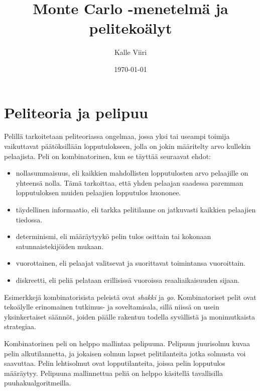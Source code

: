 \documentclass[12pt,finnish]{tktltiki2}
\title{Monte Carlo -menetelmä ja pelitekoälyt}
\author{Kalle Viiri}
\date{\today}
\theoremstyle{definition}
\theoremstyle{remark}
\begin{document}

\frontmatter      %

\maketitle        %
\makeabstract     %

\tableofcontents  %


\mainmatter       %

\section{Peliteoria ja pelipuu}

Pelillä tarkoitetaan peliteoriassa ongelmaa, jossa yksi tai useampi toimija vaikuttavat päätöksillään lopputulokseen, jolla on jokin määritelty arvo kullekin pelaajista. Peli on kombinatorinen, kun se täyttää seuraavat ehdot:~\citep{browne}

\begin{itemize}
	\item nollasummaisuus, eli kaikkien mahdollisten lopputulosten arvo pelaajille on yhteensä nolla. Tämä tarkoittaa, että yhden pelaajan saadessa paremman lopputuloksen muiden pelaajien lopputulos huononee.
	 \item täydellinen informaatio, eli tarkka pelitilanne on jatkuvasti kaikkien pelaajien tiedossa.
	 \item determinismi, eli määräytyykö pelin tulos osittain tai kokonaan satunnaistekijöiden mukaan.
	 \item vuorottainen, eli pelaajat valitsevat ja suorittavat toimintansa vuoroittain.
	 \item diskreetti, eli peliä pelataan erillisissä vuoroissa reaaliaikaisuuden sijaan.
\end{itemize}

Esimerkkejä kombinatorisista peleistä ovat \textit{shakki} ja \textit{go}. Kombinatoriset pelit ovat tekoälylle erinomainen tutkimus- ja soveltamisala, sillä niissä on usein yksinkertaiset säännöt, joiden päälle rakentuu todella syvällistä ja monimutkaista strategiaa.~\citep{browne}

Kombinatorinen peli on helppo mallintaa pelipuuna. Pelipuun juurisolmu kuvaa pelin alkutilannetta, ja jokaisen solmun lapset pelitilanteita jotka solmusta voi saavuttaa. Pelin lehtisolmut ovat lopputilanteita, joissa pelin lopputulos määräytyy. Pelipuuna mallinnettua peliä on helppo käsitellä tavallisilla puuhakualgoritmeilla.~\citep{aima}
\end{document}
